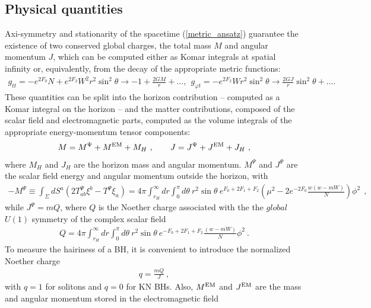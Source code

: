 \subsection{Physical quantities}
\label{sec_pq}
Axi-symmetry and stationarity of the spacetime (\ref{metric_ansatz})
 guarantee the existence of two conserved global charges, the total mass $M$ and angular momentum $J$, 
which can be computed either as Komar integrals at spatial infinity or, equivalently, 
from the decay of the appropriate metric functions:
%
\begin{eqnarray}
\label{asym}
g_{tt} =-e^{2F_0}N+e^{2F_2}W^2r^2 \sin^2 \theta 
\to
 -1+\frac{2GM}{r}+\dots, ~~
g_{\varphi t}=-e^{2F_2}W r^2 \sin^2 \theta
\to 
\frac{2GJ}{r}\sin^2\theta+\nonumber \dots.  
\end{eqnarray}
%
These quantities can be split into the horizon contribution -- computed as a Komar integral on the horizon -- and the matter contributions, composed of the scalar field and electromagnetic parts, computed as the volume integrals of the appropriate energy-momentum tensor components: 
%
\begin{eqnarray}
\label{MH-hor}
M=M^\Psi+M^{\rm EM}+M_H\ , \qquad J=J^\Psi+J^{\rm EM}+J_H\ ,
\end{eqnarray}
where $M_H$ and $J_H$  are the horizon mass and angular momentum.
$M^\Psi$ and $J^\Psi$ are the scalar field energy and angular momentum outside the horizon,
with  
\begin{align}
\label{Mpsi}
-M^\Psi\equiv  \int_{\Sigma} dS^a (2T_{ab}^\Psi \xi^b-T^\Psi\xi_a)
 = 4\pi \int_{r_H}^\infty dr \int_0^\pi d\theta~r^2\sin \theta ~e^{F_0+2F_1+F_2}
 \left(
 \mu^2-2 e^{-2F_0}\frac{w(w-mW)}{N}
 \right)\phi^2 ~~,
\end{align}
while $J^\Psi=mQ$,
where $Q$ is the Noether charge 
associated with the the $global$ $U(1)$ symmetry of the complex scalar field 
\begin{eqnarray}
\label{Q-int}
Q=4\pi \int_{r_H}^\infty dr \int_0^\pi d\theta 
~r^2\sin \theta ~e^{-F_0+2F_1+F_2}  \frac{(w-mW)}{N}\phi^2 ~.
\end{eqnarray}
To measure the hairiness of a BH, it is convenient 
to introduce the normalized Noether charge
\begin{eqnarray}
\label{q}
q=\frac{mQ}{J}~,
\end{eqnarray}
with $q=1$ for solitons and $q=0$ for KN BHs.
%
Also, $M^{\rm EM}$ and $J^{\rm EM}$ are the mass and angular momentum stored in the electromagnetic field
